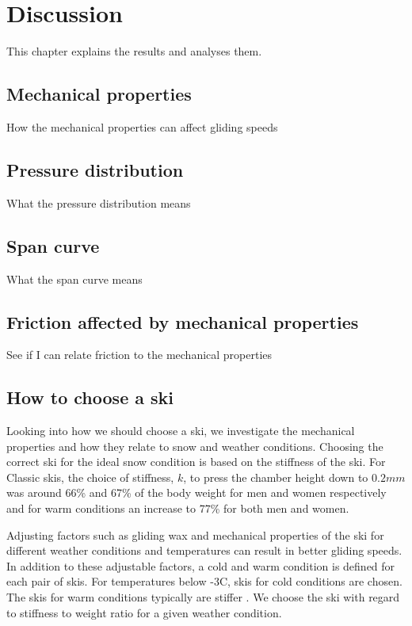 \chapter{Discussion}
This chapter explains the results and analyses them.


\section{Mechanical properties}
How the mechanical properties can affect gliding speeds

\section{Pressure distribution}
What the pressure distribution means

\section{Span curve}
What the span curve means

\section{Friction affected by mechanical properties}
See if I can relate friction to the mechanical properties

\section{How to choose a ski}
\label{sec:choosingaski}
Looking into how we should choose a ski, we investigate the mechanical properties and how they relate to snow and weather conditions.
Choosing the correct ski for the ideal snow condition is based on the stiffness of the ski. For Classic skis, the choice of stiffness, $k$, to press the chamber height down to $0.2mm$ was around 66\% and 67\% of the body weight for men and women respectively and for warm conditions an increase to 77\% for both men and women.

Adjusting factors such as gliding wax and mechanical properties of the ski for different weather conditions and temperatures can result in better gliding speeds. In addition to these adjustable factors, a cold and warm condition is defined for each pair of skis. For temperatures below -3\textdegree C, skis for cold conditions are chosen. The skis for warm conditions typically are stiffer \citep{breitschadel_variation_2012}. We choose the ski with regard to stiffness to weight ratio for a given weather condition.


